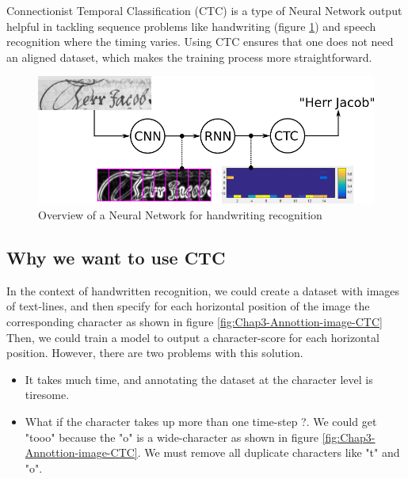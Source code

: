 Connectionist Temporal Classification (CTC) \cite{hannun2017sequence} is a type of Neural Network output helpful in tackling sequence problems like handwriting (figure \ref{fig:Chap3-Overview-CTC}) and speech recognition where the timing varies. Using CTC ensures that one does not need an aligned dataset, which makes the training process
more straightforward.

\begin{figure}[H]
	\centering
	\includegraphics[width=\textwidth]{img/Chap3/Overview-CTC}
	\caption{ Overview of a Neural Network for handwriting recognition }
	\label{fig:Chap3-Overview-CTC}
\end{figure}

\subsection{Why we want to use CTC}

In the context of handwritten recognition, we could create a dataset with images of text-lines, and then specify for each horizontal position of the image the corresponding character as shown in figure \ref{fig:Chap3-Annottion-image-CTC} Then, we could train a model to output a character-score for each horizontal position. However, there are two problems with this solution.

\begin{itemize}
	\item It takes much time, and annotating the dataset at the character level is tiresome.
	\item What if the character takes up more than one time-step ?. We could get "tooo" because the "o" is a wide-character as shown in figure \ref{fig:Chap3-Annottion-image-CTC}. We must remove all duplicate characters like "t" and "o".
\end{itemize}

